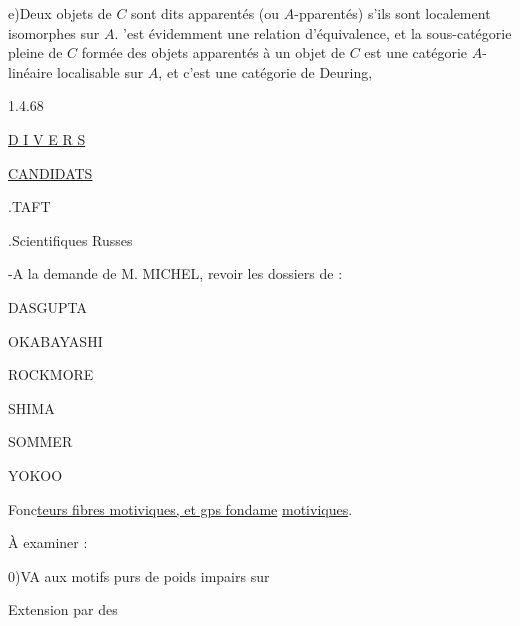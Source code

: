 e)\quad Deux objets de $C$ sont dits apparentés (ou $A$-pparentés) s'ils sont localement isomorphes sur $A$. 'est évidemment une relation d'équivalence, et la sous-catégorie pleine de $C$ formée des objets apparentés à un objet de $C$ est une catégorie  $A$-linéaire localisable sur $A$, et c'est une catégorie de Deuring,


\begin{flushright}1.4.68\end{flushright}

\uline{D I V E R S}

\uline{CANDIDATS}

.\quad TAFT

.\quad Scientifiques Russes

-\quad A la demande de M. MICHEL, revoir les dossiers de :

DASGUPTA

OKABAYASHI

ROCKMORE

SHIMA

SOMMER

YOKOO



Fonc\uline{teurs fibres motiviques, et gps fondame}%
\uline{motiviques}.

À examiner :

0)\quad VA
 aux motifs purs de poids impairs sur

Extension    par des 

